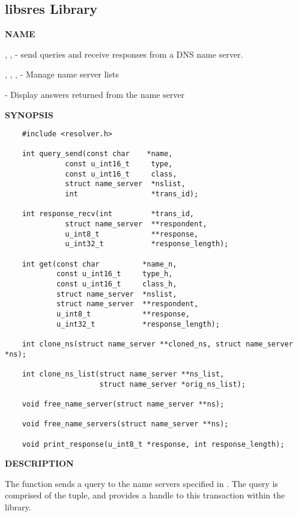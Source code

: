 \clearpage

\subsection{\bf libsres Library}

{\bf NAME}

, ,  - 
send queries and receive responses from a DNS name server.

, ,
,  -
Manage name server lists

 - Display answers returned from the name server

{\bf SYNOPSIS}

\begin{verbatim}
    #include <resolver.h>

    int query_send(const char    *name,
              const u_int16_t     type,
              const u_int16_t     class,
              struct name_server  *nslist,
              int                 *trans_id);

    int response_recv(int         *trans_id,
              struct name_server  **respondent,
              u_int8_t            **response,
              u_int32_t           *response_length);

    int get(const char          *name_n,
            const u_int16_t     type_h,
            const u_int16_t     class_h,
            struct name_server  *nslist,
            struct name_server  **respondent,
            u_int8_t            **response,
            u_int32_t           *response_length);

    int clone_ns(struct name_server **cloned_ns, struct name_server *ns);

    int clone_ns_list(struct name_server **ns_list,
                      struct name_server *orig_ns_list);

    void free_name_server(struct name_server **ns);

    void free_name_servers(struct name_server **ns);

    void print_response(u_int8_t *response, int response_length);
\end{verbatim}

{\bf DESCRIPTION}

The  function sends a query to the name servers specified
in .  The query is comprised of the 
tuple, and  provides a handle to this transaction within the
 library.

